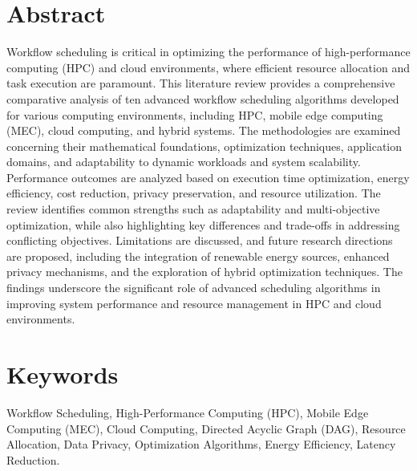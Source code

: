 \documentclass[a4paper, final]{article}
\begin{document}
\newpage

\tableofcontents

\cleardoublepage
{}
\newpage
{}
\section*{Abstract}
Workflow scheduling is critical in optimizing the performance of high-performance computing (HPC) and 
cloud environments, where efficient resource allocation and task execution are paramount. This literature 
review provides a comprehensive comparative analysis of ten advanced workflow scheduling algorithms developed 
for various computing environments, including HPC, mobile edge computing (MEC), cloud computing, and hybrid systems. 
The methodologies are examined concerning their mathematical foundations, optimization techniques, application domains, 
and adaptability to dynamic workloads and system scalability. Performance outcomes are analyzed based on execution time 
optimization, energy efficiency, cost reduction, privacy preservation, and resource utilization. The review identifies 
common strengths such as adaptability and multi-objective optimization, while also highlighting key differences and 
trade-offs in addressing conflicting objectives. Limitations are discussed, and future research directions are proposed, 
including the integration of renewable energy sources, enhanced privacy mechanisms, and the exploration of hybrid 
optimization techniques. The findings underscore the significant role of advanced scheduling algorithms in improving 
system performance and resource management in HPC and cloud environments.

\cleardoublepage
{}
\newpage
{}
\section*{Keywords}
Workflow Scheduling, High-Performance Computing (HPC), Mobile Edge Computing (MEC), Cloud Computing, 
Directed Acyclic Graph (DAG), Resource Allocation, Data Privacy, Optimization Algorithms, 
Energy Efficiency, Latency Reduction.

\newpage
\cleardoublepage
{}
\end{document}
